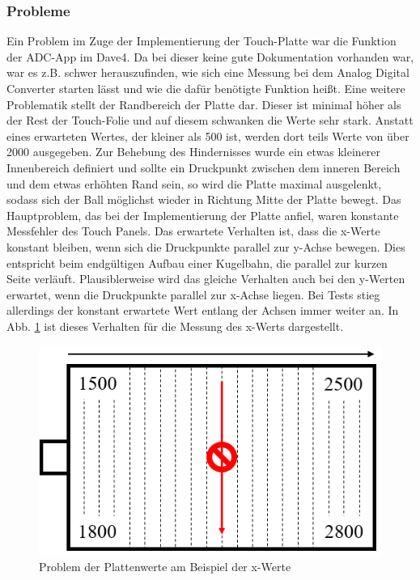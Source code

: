 \documentclass[12pt,a4paper,bibliography=totoc,listof=totoc]{scrartcl}
\begin{document}
\subsubsection{Probleme} \label{subsec:ProblemePlatte}
Ein Problem im Zuge der Implementierung der Touch-Platte war die Funktion der ADC-App im Dave4. Da bei dieser keine gute Dokumentation vorhanden war, war es z.B. schwer herauszufinden, wie sich eine Messung bei dem Analog Digital Converter starten lässt und wie die dafür benötigte Funktion heißt. \newline
Eine weitere Problematik stellt der Randbereich der Platte dar. Dieser ist minimal höher als der Rest der Touch-Folie und auf diesem schwanken die Werte sehr stark. Anstatt eines erwarteten Wertes, der kleiner als 500 ist, werden dort teils Werte von über 2000 ausgegeben. Zur Behebung des Hindernisses wurde ein etwas kleinerer Innenbereich definiert und sollte ein Druckpunkt zwischen dem inneren Bereich und dem etwas erhöhten Rand sein, so wird die Platte maximal ausgelenkt, sodass sich der Ball möglichst wieder in Richtung Mitte der Platte bewegt.
Das Hauptproblem, das bei der Implementierung der Platte anfiel, waren konstante Messfehler des Touch Panels. Das erwartete Verhalten ist, dass die x-Werte konstant bleiben, wenn sich die Druckpunkte parallel zur y-Achse bewegen. Dies entspricht beim endgültigen Aufbau einer Kugelbahn, die parallel zur kurzen Seite verläuft. Plausiblerweise wird das gleiche Verhalten auch bei den y-Werten erwartet, wenn die Druckpunkte parallel zur x-Achse liegen.
Bei Tests stieg allerdings der konstant erwartete Wert entlang der Achsen immer weiter an. In Abb. \ref{fig:ProblemPlattenwerte} ist dieses Verhalten für die Messung des x-Werts dargestellt.
\begin{figure}[htbp]
	\centering
	\includegraphics[scale = 0.5]{pics/ProblemPlattenwerte}
	\caption{Problem der Plattenwerte am Beispiel der x-Werte}
	\label{fig:ProblemPlattenwerte}
\end{figure}
\end{document}
